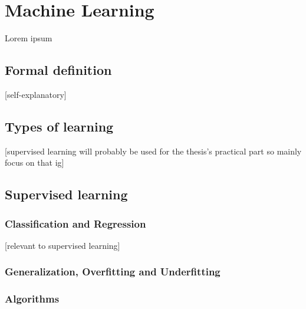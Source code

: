 \documentclass[../projekt.tex]{subfiles}
\begin{document}

\chapter{Machine Learning}
\label{chap-ml}

Lorem ipsum

\section{Formal definition}
[self-explanatory]

\section{Types of learning}
[supervised learning will probably be used for the thesis's practical part so mainly focus on that ig]

\section{Supervised learning}
\subsection{Classification and Regression}
[relevant to supervised learning]
\subsection{Generalization, Overfitting and Underfitting}

\subsection{Algorithms}

\end{document}
